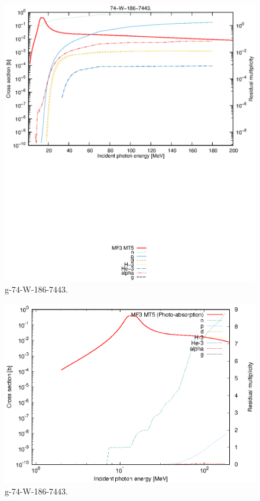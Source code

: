 \begin{figure}
 \includegraphics[width=\linewidth]{eps/g_74-W-186_7443.eps}
  \caption{g-74-W-186-7443.}
\end{figure}
\newpage \clearpage

\begin{figure}
 \includegraphics[width=\linewidth]{eps-log/g_74-W-186_7443.eps}
 \caption{g-74-W-186-7443.}
\end{figure}
\newpage \clearpage

